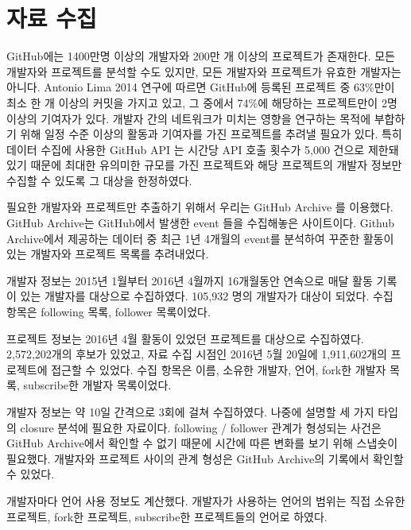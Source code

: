 \documentclass[10pt, a4paper, titlepage]{article}
\begin{document}
\section {자료 수집}

GitHub에는 1400만명 이상의 개발자와 200만 개 이상의 프로젝트가 존재한다. 모든 개발자와 프로젝트를 분석할 수도 있지만, 모든 개발자와 프로젝트가 유효한 개발자는 아니다. Antonio Lima 2014 \cite{r6} 연구에 따르면 GitHub에 등록된 프로젝트 중 63\%만이 최소 한 개 이상의 커밋을 가지고 있고, 그 중에서 74\%에 해당하는 프로젝트만이 2명 이상의 기여자가 있다. 개발자 간의 네트워크가 미치는 영향을 연구하는 목적에 부합하기 위해 일정 수준 이상의 활동과 기여자를 가진 프로젝트를 추려낼 필요가 있다. 특히 데이터 수집에 사용한 GitHub API \cite{r7}는 시간당 API 호출 횟수가 5,000 건으로 제한돼 있기 때문에 최대한 유의미한 규모를 가진 프로젝트와 해당 프로젝트의 개발자 정보만 수집할 수 있도록 그 대상을 한정하였다.

	필요한 개발자와 프로젝트만 추출하기 위해서 우리는 GitHub Archive \cite{r8}를  이용했다. GitHub Archive는 GitHub에서 발생한 event \cite{r9} 들을 수집해놓은 사이트이다. Github Archive에서 제공하는 데이터 중 최근 1년 4개월의 event를 분석하여 꾸준한 활동이 있는 개발자와 프로젝트 목록를 추려내었다.


개발자 정보는 2015년 1월부터 2016년 4월까지 16개월동안 연속으로 매달 활동 기록이 있는 개발자를 대상으로 수집하였다. 105,932 명의 개발자가 대상이 되었다. 수집 항목은 following 목록, follower 목록이었다.


프로젝트 정보는 2016년 4월 활동이 있었던 프로젝트를 대상으로 수집하였다. 2,572,202개의 후보가 있었고, 자료 수집 시점인 2016년 5월 20일에 1,911,602개의 프로젝트에 접근할 수 있었다. 수집 항목은 이름, 소유한 개발자, 언어, fork한 개발자 목록, subscribe한 개발자 목록이었다.

개발자 정보는 약 10일 간격으로 3회에 걸쳐 수집하였다. 나중에 설명할 세 가지 타입의 closure 분석에 필요한 자료이다. following / follower 관계가 형성되는 사건은 GitHub Archive에서 확인할 수 없기 때문에 시간에 따른 변화를 보기 위해 스냅숏이 필요했다.	개발자와 프로젝트 사이의 관계 형성은 GitHub Archive의 기록에서 확인할 수 있었다.

개발자마다 언어 사용 정보도 계산했다. 개발자가 사용하는 언어의 범위는 직접 소유한 프로젝트, fork한 프로젝트, subscribe한 프로젝트들의 언어로 하였다.
\end{document}
